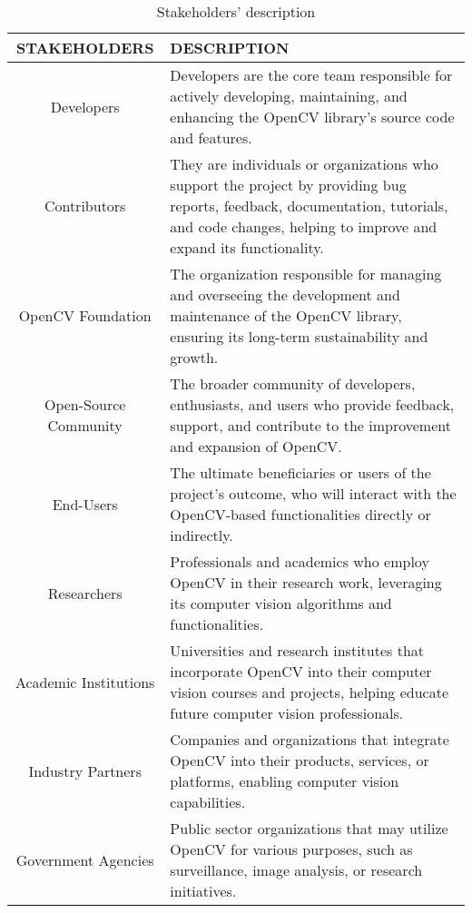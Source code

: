 \begin{table} [H]
\begin{tabular}{|c|m{11.4cm}|} 
\hline
\textbf{STAKEHOLDERS} & \textbf{DESCRIPTION} \\ \hline
Developers & Developers are the core team responsible for actively developing, maintaining, and enhancing the OpenCV library's source code and features. \\ \hline 

Contributors & They are individuals or organizations who support the project by providing bug reports, feedback, documentation, tutorials, and code changes, helping to improve and expand its functionality. \\ \hline 

OpenCV Foundation & The organization responsible for managing and overseeing the development and maintenance of the OpenCV library, ensuring its long-term sustainability and growth. \\ \hline 

Open-Source Community & The broader community of developers, enthusiasts, and users who provide feedback, support, and contribute to the improvement and expansion of OpenCV. \\ \hline 

End-Users & The ultimate beneficiaries or users of the project's outcome, who will interact with the OpenCV-based functionalities directly or indirectly. \\ \hline 

Researchers & Professionals and academics who employ OpenCV in their research work, leveraging its computer vision algorithms and functionalities. \\ \hline 

Academic Institutions & Universities and research institutes that incorporate OpenCV into their computer vision courses and projects, helping educate future computer vision professionals. \\ \hline 

Industry Partners & Companies and organizations that integrate OpenCV into their products, services, or platforms, enabling computer vision capabilities. \\ \hline 

Government Agencies & Public sector organizations that may utilize OpenCV for various purposes, such as surveillance, image analysis, or research initiatives. \\ \hline 
\end{tabular}
\caption{Stakeholders' description \label{Table::StakeholdersDescription}}
\end{table}
